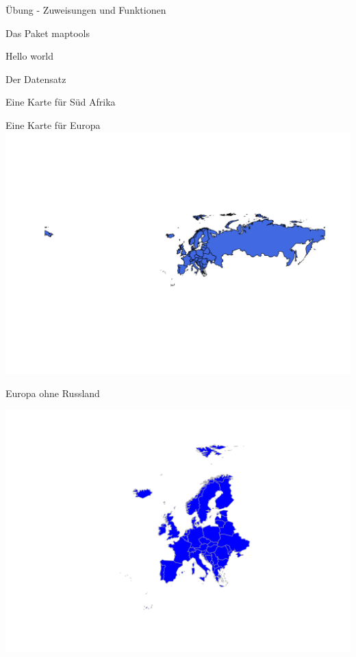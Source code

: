 \documentclass[ignorenonframetext,]{beamer}
\newenvironment{Shaded}{\begin{snugshade}}{\end{snugshade}}
\newcommand{\DataTypeTok}[1]{\textcolor[rgb]{0.74,0.68,0.62}{\underline{#1}}}
\newcommand{\KeywordTok}[1]{\textcolor[rgb]{0.26,0.66,0.93}{\textbf{#1}}}
\newcommand{\NormalTok}[1]{\textcolor[rgb]{0.74,0.68,0.62}{#1}}
\newcommand{\OperatorTok}[1]{\textcolor[rgb]{0.74,0.68,0.62}{#1}}
\newcommand{\StringTok}[1]{\textcolor[rgb]{0.02,0.61,0.04}{#1}}
\begin{document}
\begin{frame}[fragile]{Übung - Zuweisungen und Funktionen}
\begin{frame}[fragile]{Das Paket maptools}
\begin{frame}[fragile]{Hello world}
\begin{frame}[fragile]{Der Datensatz}
\begin{frame}[fragile]{Eine Karte für Süd Afrika}
\begin{frame}[fragile]{Eine Karte für Europa}
\includegraphics{Geomedizin_files/figure-beamer/unnamed-chunk-75-1.pdf}

\end{frame}

\begin{frame}[fragile]{Europa ohne Russland}
\protect\hypertarget{europa-ohne-russland}{}

\begin{Shaded}
\end{Shaded}

\includegraphics{Geomedizin_files/figure-beamer/unnamed-chunk-76-1.pdf}


\end{frame}
\end{frame}
\end{frame}
\end{frame}
\end{frame}
\end{frame}
\end{document}
